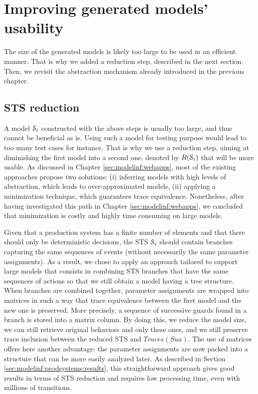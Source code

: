 \section{Improving generated models' usability}
\label{sec:modelinf:usability}

The size of the generated models is likely too large to be used
in an efficient manner. That is why we added a reduction step,
described in the next section. Then, we revisit the abstraction
mechanism already introduced in the previous chapter.

\subsection{STS reduction}
\label{sec:modelinf:prodsystems:reduction}

A model $\EuScript{S}_i$ constructed with the above steps is
usually too large, and thus cannot be beneficial as is. Using
such a model for testing purpose would lead to too many test
cases for instance. That is why we use a reduction step, aiming
at diminishing the first model into a second one, denoted by
$R(\EuScript{S}_i)$ that will be more usable. As discussed in
Chapter \ref{sec:modelinf:webapps}, most of the existing
approaches propose two solutions: (i) inferring models with high
levels of abstraction, which leads to over-approximated models,
(ii) applying a minimization technique, which guarantees trace
equivalence.  Nonetheless, after having investigated this path in
Chapter \ref{sec:modelinf:webapps}, we concluded that
minimization is costly and highly time consuming on large models.

Given that a production system has a finite number of elements
and that there should only be deterministic decisions, the STS
$\EuScript{S}_i$ should contain branches capturing the same
sequences of events (without necessarily the same parameter
assignments).  As a result, we chose to apply an approach
tailored to support large models that
consists in combining STS branches that have the same
sequences of actions so that we still obtain a model having a
tree structure. When branches are combined together, parameter
assignments are wrapped into matrices in such a way that trace
equivalence between the first model and the new one is preserved.
More precisely, a sequence of successive guards found in a branch
is stored into a matrix column. By doing this, we reduce the
model size, we can still retrieve original behaviors and only
these ones, and we still preserve trace inclusion between the
reduced STS and $Traces(Sua)$.
The use of matrices offers here another advantage: the parameter
assignments are now packed into a structure that can be more
easily analyzed later. As described in Section
\ref{sec:modelinf:prodsystems:results}, this straightforward
approach gives good results in terms of STS reduction and
requires low processing time, even with millions of transitions.

